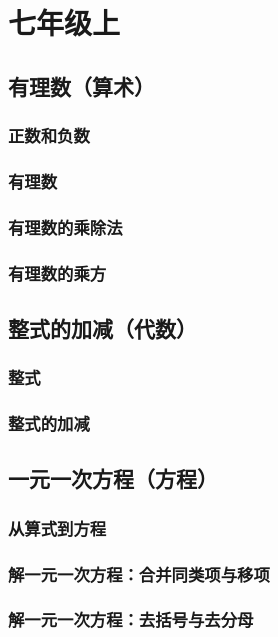 \documentclass[cn,blue,10pt]{elegantbook}
\begin{document}
\maketitle

\tableofcontents

\mainmatter

\part{七年级上}
\chapter{有理数（算术）}
\section{正数和负数}
\section{有理数}
\section{有理数的乘除法}
\section{有理数的乘方}
\chapter{整式的加减（代数）}
\section{整式}
\section{整式的加减}
\chapter{一元一次方程（方程）}
\section{从算式到方程}
\section{解一元一次方程：合并同类项与移项}
\section{解一元一次方程：去括号与去分母}
\end{document}
